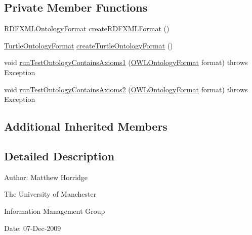 \subsection*{Private Member Functions}
\begin{DoxyCompactItemize}
\item 
\hyperlink{classorg_1_1semanticweb_1_1owlapi_1_1io_1_1_r_d_f_x_m_l_ontology_format}{R\-D\-F\-X\-M\-L\-Ontology\-Format} \hyperlink{classorg_1_1semanticweb_1_1owlapi_1_1api_1_1test_1_1ontology_1_1_ontology_contains_axiom_test_case_ac41d64c3cb75eaaef60f73064f4ff71f}{create\-R\-D\-F\-X\-M\-L\-Format} ()
\item 
\hyperlink{classorg_1_1coode_1_1owlapi_1_1turtle_1_1_turtle_ontology_format}{Turtle\-Ontology\-Format} \hyperlink{classorg_1_1semanticweb_1_1owlapi_1_1api_1_1test_1_1ontology_1_1_ontology_contains_axiom_test_case_aa1b0d7be810376bed158a1c384004eb3}{create\-Turtle\-Ontology\-Format} ()
\item 
void \hyperlink{classorg_1_1semanticweb_1_1owlapi_1_1api_1_1test_1_1ontology_1_1_ontology_contains_axiom_test_case_a091181ddce651ef649f47126950d679e}{run\-Test\-Ontology\-Contains\-Axioms1} (\hyperlink{classorg_1_1semanticweb_1_1owlapi_1_1model_1_1_o_w_l_ontology_format}{O\-W\-L\-Ontology\-Format} format)  throws Exception 
\item 
void \hyperlink{classorg_1_1semanticweb_1_1owlapi_1_1api_1_1test_1_1ontology_1_1_ontology_contains_axiom_test_case_a586955c151509ab88425f066ff37d4ac}{run\-Test\-Ontology\-Contains\-Axioms2} (\hyperlink{classorg_1_1semanticweb_1_1owlapi_1_1model_1_1_o_w_l_ontology_format}{O\-W\-L\-Ontology\-Format} format)  throws Exception 
\end{DoxyCompactItemize}
\subsection*{Additional Inherited Members}


\subsection{Detailed Description}
Author\-: Matthew Horridge\par
 The University of Manchester\par
 Information Management Group\par
 Date\-: 07-\/\-Dec-\/2009 

